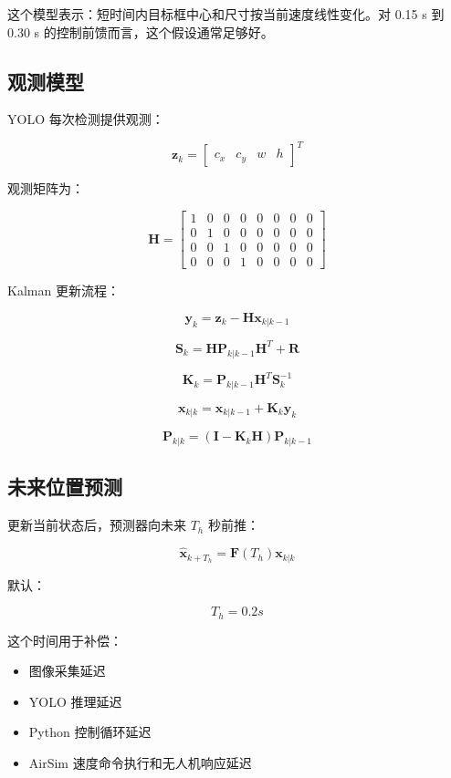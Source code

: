 \documentclass[UTF8,a4paper,11pt]{ctexart}
\begin{document}
这个模型表示：短时间内目标框中心和尺寸按当前速度线性变化。对 0.15 s 到 0.30 s 的控制前馈而言，这个假设通常足够好。

\subsection{观测模型}

YOLO 每次检测提供观测：

\[
\mathbf{z}_k=
\begin{bmatrix}
c_x & c_y & w & h
\end{bmatrix}^T
\]

观测矩阵为：

\[
\mathbf{H}=
\begin{bmatrix}
1&0&0&0&0&0&0&0\\
0&1&0&0&0&0&0&0\\
0&0&1&0&0&0&0&0\\
0&0&0&1&0&0&0&0
\end{bmatrix}
\]

Kalman 更新流程：

\[
\mathbf{y}_k=\mathbf{z}_k-\mathbf{H}\mathbf{x}_{k|k-1}
\]

\[
\mathbf{S}_k=\mathbf{H}\mathbf{P}_{k|k-1}\mathbf{H}^T+\mathbf{R}
\]

\[
\mathbf{K}_k=\mathbf{P}_{k|k-1}\mathbf{H}^T\mathbf{S}_k^{-1}
\]

\[
\mathbf{x}_{k|k}=\mathbf{x}_{k|k-1}+\mathbf{K}_k\mathbf{y}_k
\]

\[
\mathbf{P}_{k|k}=(\mathbf{I}-\mathbf{K}_k\mathbf{H})\mathbf{P}_{k|k-1}
\]

\subsection{未来位置预测}

更新当前状态后，预测器向未来 $T_h$ 秒前推：

\[
\hat{\mathbf{x}}_{k+T_h}=\mathbf{F}(T_h)\mathbf{x}_{k|k}
\]

默认：

\[
T_h=0.2s
\]

这个时间用于补偿：

\begin{itemize}
  \item 图像采集延迟
  \item YOLO 推理延迟
  \item Python 控制循环延迟
  \item AirSim 速度命令执行和无人机响应延迟
\end{itemize}
\end{document}
